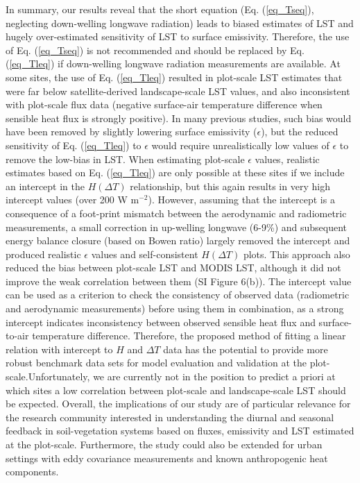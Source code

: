 \documentclass[fleqn,10pt]{wlscirep}
\begin{document}
In summary, our results reveal that the short equation (Eq. (\ref{eq_Tseq}), neglecting down-welling longwave radiation) leads to biased estimates of LST and hugely over-estimated sensitivity of LST to surface emissivity. Therefore, the use of Eq. (\ref{eq_Tseq}) is not recommended and should be replaced by Eq. (\ref{eq_Tleq}) if down-welling longwave radiation measurements are available. At some sites, the use of Eq. (\ref{eq_Tleq}) resulted in plot-scale LST estimates that were far below satellite-derived landscape-scale LST values, and also inconsistent with plot-scale flux data (negative surface-air temperature difference when sensible heat flux is strongly positive). In many previous studies, such bias would have been removed by slightly lowering surface emissivity ($\epsilon$), but the reduced sensitivity of Eq. (\ref{eq_Tleq}) to $\epsilon$ would require unrealistically low values of $\epsilon$ to remove the low-bias in LST. When estimating plot-scale $\epsilon$ values, realistic estimates based on Eq. (\ref{eq_Tleq}) are only possible at these sites if we include an intercept in the $H (\Delta T)$ relationship, but this again results in very high intercept values (over 200 W m$^{-2}$). However, assuming that the intercept is a consequence of a foot-print mismatch between the aerodynamic and radiometric measurements, a small correction in up-welling longwave (6-9\%) and subsequent energy balance closure (based on Bowen ratio) largely removed the intercept and produced realistic $\epsilon$ values and self-consistent $H(\Delta T)$ plots. This approach also reduced the bias between plot-scale LST and MODIS LST, although it did not improve the weak correlation between them (SI Figure 6(b)). The intercept value can be used as a criterion to check the consistency of observed data (radiometric and aerodynamic measurements) before using them in combination, as a strong intercept indicates inconsistency between observed sensible heat flux and surface-to-air temperature difference. Therefore, the proposed method of fitting a linear relation with intercept to $H$ and $\Delta T$ data has the potential to provide more robust benchmark data sets for model evaluation and validation at the plot-scale.Unfortunately, we are currently not in the position to predict a priori at which sites a low correlation between plot-scale and landscape-scale LST should be expected. Overall, the implications of our study are of particular relevance for the research community interested in understanding the diurnal and seasonal feedback in soil-vegetation systems based on fluxes, emissivity and LST estimated at the plot-scale. Furthermore, the study could also be extended for urban settings with eddy covariance measurements and known anthropogenic heat components.
\end{document}
